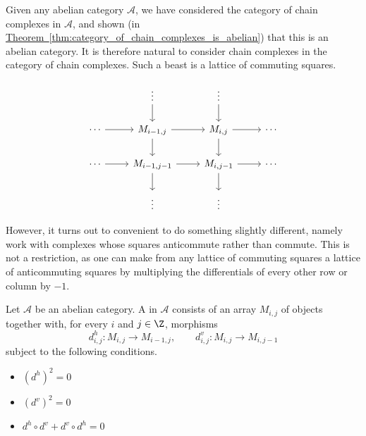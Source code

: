 \documentclass[main.tex]{subfiles}
\begin{document}
Given any abelian category $\mathcal{A}$, we have considered the category of chain complexes in $\mathcal{A}$, and shown (in \hyperref[thm:category_of_chain_complexes_is_abelian]{Theorem~\ref*{thm:category_of_chain_complexes_is_abelian}}) that this is an abelian category. It is therefore natural to consider chain complexes in the category of chain complexes. Such a beast is a lattice of commuting squares.

\begin{equation*}
  \begin{tikzcd}
    & \vdots
    \arrow[d]
    & \vdots
    \arrow[d]
    \\
    \cdots
    \arrow[r]
    & M_{i-1,j}
    \arrow[r]
    \arrow[d]
    & M_{i, j}
    \arrow[r]
    \arrow[d]
    & \cdots
    \\
    \cdots
    \arrow[r]
    & M_{i-1,j-1}
    \arrow[r]
    \arrow[d]
    & M_{i, j-1}
    \arrow[r]
    \arrow[d]
    & \cdots
    \\
    & \vdots
    & \vdots
  \end{tikzcd}
\end{equation*}

However, it turns out to convenient to do something slightly different, namely work with complexes whose squares anticommute rather than commute. This is not a restriction, as one can make from any lattice of commuting squares a lattice of anticommuting squares by multiplying the differentials of every other row or column by $-1$.

\begin{definition}
  \label{def:double_complex}
  Let $\mathcal{A}$ be an abelian category. A  in $\mathcal{A}$ consists of an array $M_{i,j}$ of objects together with, for every $i$ and $j \in \Z$, morphisms
  \begin{equation*}
    d^{h}_{i,j}\colon M_{i,j} \to M_{i-1,j},\qquad d^{v}_{i,j}\colon M_{i,j} \to M_{i, j-1}
  \end{equation*}
  subject to the following conditions.
  \begin{itemize}
    \item $(d^{h})^{2} = 0$

    \item $(d^{v})^{2} = 0$

    \item $d^{h} \circ d^{v} + d^{v} \circ d^{h} = 0$
  \end{itemize}

\end{definition}
\end{document}
